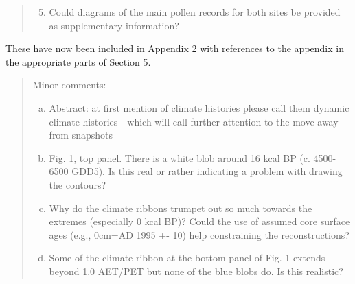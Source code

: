 \documentclass[a4paper,11pt]{article}
\begin{document}
\begin{framed} \begin{quote}
\begin{enumerate}
\setcounter{enumi}{4}
\item Could diagrams of the main pollen records for both sites be provided as supplementary information?
\end{enumerate}
\end{quote} \end{framed}

These have now been included in Appendix 2 with references to the appendix in the appropriate parts of Section 5.

\begin{framed} \begin{quote}
Minor comments:
\begin{enumerate}[(a)]
\item Abstract: at first mention of climate histories please call them dynamic climate histories - which will call further attention to the move away from snapshots
\item Fig. 1, top panel. There is a white blob around 16 kcal BP (c. 4500-6500 GDD5). Is this real or rather indicating a problem with drawing the contours?
\item Why do the climate ribbons trumpet out so much towards the extremes (especially 0 kcal BP)? Could the use of assumed core surface ages (e.g., 0cm=AD 1995 +- 10) help constraining the reconstructions? 
\item Some of the climate ribbon at the bottom panel of Fig. 1 extends beyond 1.0 AET/PET but none of the blue blobs do. Is this realistic?
\end{enumerate}
\end{quote} \end{framed}
\end{document}
